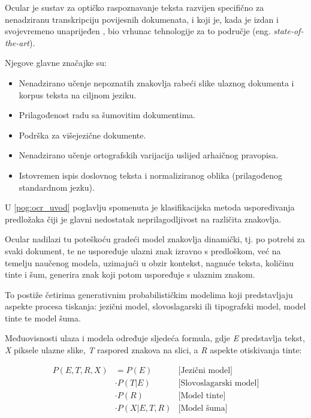 \documentclass[zavrsnirad]{fer}
\begin{document}
Ocular \cite{Berg2013} je sustav za optičko raspoznavanje teksta razvijen specifično za nenadziranu transkripciju povijesnih dokumenata, i koji je, kada je izdan i svojevremeno unaprijeđen \cite{Berg2014}, bio vrhunac tehnologije za to područje (eng. \textit{state-of-the-art}).

Njegove glavne značajke su: \cite{Ocular}

\begin{itemize}
	\item Nenadzirano učenje nepoznatih znakovlja rabeći slike ulaznog dokumenta i korpus teksta na ciljnom jeziku.
	\item Prilagođenost radu sa šumovitim dokumentima.
	\item Podrška za višejezične dokumente.
	\item Nenadzirano učenje ortografskih varijacija uslijed arhaičnog pravopisa.
	\item Istovremen ispis doslovnog teksta i normaliziranog oblika (prilagođenog standardnom jezku).
\end{itemize}

U \ref{pog:ocr_uvod} poglavlju spomenuta je klasifikacijska metoda uspoređivanja predložaka čiji je glavni nedostatak neprilagodljivost na različita znakovlja.

Ocular nadilazi tu poteškoću gradeći model znakovlja dinamički, tj. po potrebi za svaki dokument, te ne uspoređuje ulazni znak izravno s predloškom, već na temelju naučenog modela, uzimajući u obzir kontekst, nagnuće teksta, količinu tinte i šum, generira znak koji potom uspoređuje s ulaznim znakom.

To postiže četirima generativnim probabilističkim modelima koji predstavljaju aspekte procesa tiskanja: jezični model, slovoslagarski ili tipografski model, model tinte te model šuma.

Međuovisnosti ulaza i modela određuje sljedeća formula, \cite{Berg2013} gdje \textit{E} predstavlja tekst, \textit{X} piksele ulazne slike, \textit{T} raspored znakova na slici, a \textit{R} aspekte otiskivanja tinte:

\[
\begin{aligned}
	P(E, T, R, X) &= P(E) & \text{[Jezični model]} \\
	&\cdot P(T | E) & \text{[Slovoslagarski model]} \\
	&\cdot P(R) & \text{[Model tinte]} \\
	&\cdot P(X | E, T, R) & \text{[Model šuma]}
\end{aligned}
\]
\end{document}
